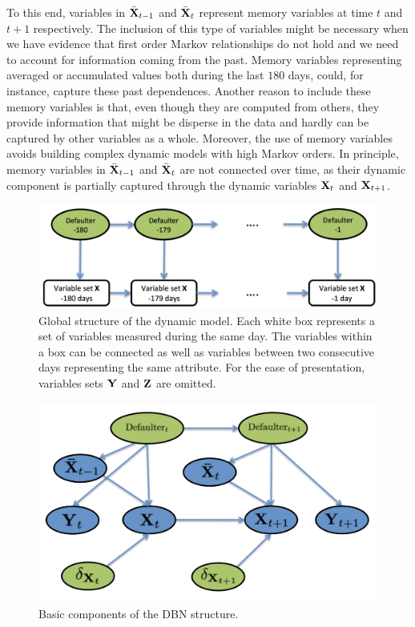 To this end, variables in $\bar{{\bf X}}_{t-1}$ and $\bar{\bf{X}}_{t}$ represent memory variables at time $t$ and $t+1$ respectively. The inclusion of this type of variables might be necessary when we have evidence that first order Markov relationships do not hold and we need to account for information coming from the past. Memory variables representing averaged or accumulated values both during the last $180$ days, could, for instance, capture these past dependences. Another reason to include these memory variables is that, even though they are computed from others, they provide information that might be disperse in the data and hardly can be captured by other variables as a whole. Moreover, the use of memory variables avoids building complex dynamic models with high Markov orders. In principle, memory variables in $\bar{{\bf X}}_{t-1}$ and $\bar{{\bf X}}_{t}$ are not connected over time, as their dynamic component is partially captured through the dynamic variables ${\bf X}_{t}$ and ${\bf X}_{t+1}$.


\begin{figure}[htbp]
\begin{center}
\includegraphics[scale=0.45]{./figures/CajaMarModel1}
\caption{Global structure of the dynamic model. Each white box represents a set of variables measured during the same day. The variables within a box can be connected as well as variables between two consecutive days representing the same attribute. For the ease of presentation, variables sets $\mathbf{Y}$ and $\mathbf{Z}$ are omitted.}
\label{fig:global_temp}
\end{center}
\end{figure}


\begin{figure}[htbp]
\begin{center}
\includegraphics[scale=0.45]{./figures/CajaMarModel2}
\caption{Basic components of the DBN structure.}
\label{fig:component}
\end{center}
\end{figure}

